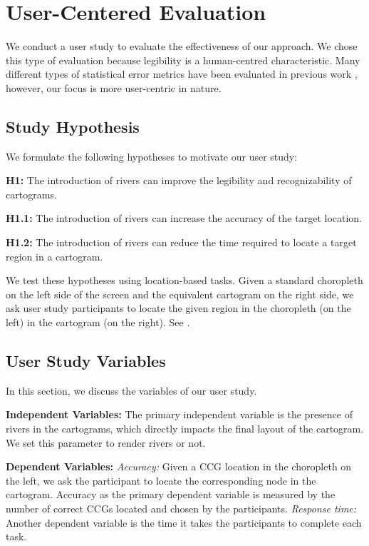\documentclass[Afour,sagev,times]{sagej}
\newcommand{\bobgraph}[1]{\noindent\textbf{#1}}
\begin{document}
\newcommand{\pCount}{24 }
\section{User-Centered Evaluation}\label{sec:{User-Centered Evaluation}}

We conduct a user study to evaluate the effectiveness of our approach. We chose this type of evaluation because legibility is a human-centred characteristic. Many different types of statistical error metrics have been evaluated in previous work \cite{nusrat2016State}, however, our focus is more user-centric in nature.

\subsection{Study Hypothesis}\label{subsec:{Study Hypothesis}}

We formulate the following hypotheses to motivate our user study:

\textbf{H1:} The introduction of rivers can improve the legibility and recognizability of cartograms.

\textbf{H1.1:} The introduction of rivers can increase the accuracy of the target location.

\textbf{H1.2:} The introduction of rivers can reduce the time required to locate a target region in a cartogram.

We test these hypotheses using location-based tasks. Given a standard choropleth on the left side of the screen and the equivalent cartogram on the right side, we ask user study participants to locate the given region in the choropleth (on the left) in the cartogram (on the right). See .

\subsection{User Study Variables}\label{subsec:{User Study Variables}}

In this section, we discuss the variables of our user study.

\bobgraph{Independent Variables: }The primary independent variable is the presence of rivers in the cartograms, which directly impacts the final layout of the cartogram. We set this parameter to render rivers or not.

\bobgraph{Dependent Variables: }\textit{Accuracy:} Given a CCG location in the choropleth on the left, we ask the participant to locate the corresponding node in the cartogram. Accuracy as the primary dependent variable is measured by the number of correct CCGs located and chosen by the participants. \textit{Response time:} Another dependent variable is the time it takes the participants to complete each task.
\end{document}
